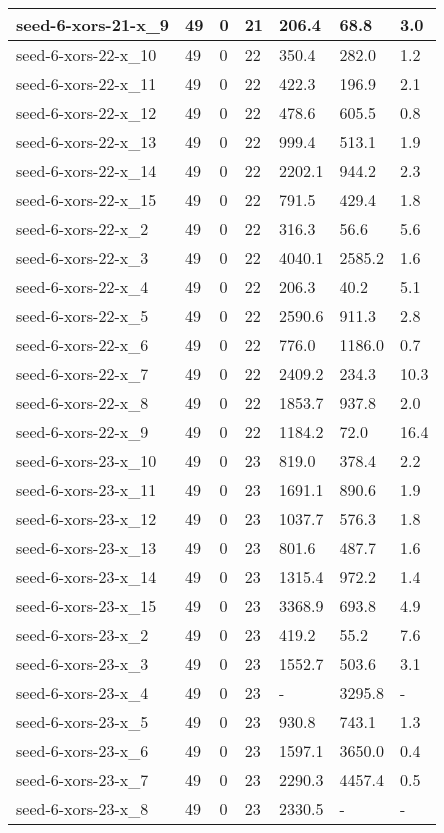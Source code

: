 \begin{scriptsize}
\begin{longtable}{|p{5cm}|l|l|l|l|l|l|}
seed-6-xors-21-x\_9&49&0&21&206.4&68.8&3.0 \\ \hline 
seed-6-xors-22-x\_10&49&0&22&350.4&282.0&1.2 \\ \hline 
seed-6-xors-22-x\_11&49&0&22&422.3&196.9&2.1 \\ \hline 
seed-6-xors-22-x\_12&49&0&22&478.6&605.5&0.8 \\ \hline 
seed-6-xors-22-x\_13&49&0&22&999.4&513.1&1.9 \\ \hline 
seed-6-xors-22-x\_14&49&0&22&2202.1&944.2&2.3 \\ \hline 
seed-6-xors-22-x\_15&49&0&22&791.5&429.4&1.8 \\ \hline 
seed-6-xors-22-x\_2&49&0&22&316.3&56.6&5.6 \\ \hline 
seed-6-xors-22-x\_3&49&0&22&4040.1&2585.2&1.6 \\ \hline 
seed-6-xors-22-x\_4&49&0&22&206.3&40.2&5.1 \\ \hline 
seed-6-xors-22-x\_5&49&0&22&2590.6&911.3&2.8 \\ \hline 
seed-6-xors-22-x\_6&49&0&22&776.0&1186.0&0.7 \\ \hline 
seed-6-xors-22-x\_7&49&0&22&2409.2&234.3&10.3 \\ \hline 
seed-6-xors-22-x\_8&49&0&22&1853.7&937.8&2.0 \\ \hline 
seed-6-xors-22-x\_9&49&0&22&1184.2&72.0&16.4 \\ \hline 
seed-6-xors-23-x\_10&49&0&23&819.0&378.4&2.2 \\ \hline 
seed-6-xors-23-x\_11&49&0&23&1691.1&890.6&1.9 \\ \hline 
seed-6-xors-23-x\_12&49&0&23&1037.7&576.3&1.8 \\ \hline 
seed-6-xors-23-x\_13&49&0&23&801.6&487.7&1.6 \\ \hline 
seed-6-xors-23-x\_14&49&0&23&1315.4&972.2&1.4 \\ \hline 
seed-6-xors-23-x\_15&49&0&23&3368.9&693.8&4.9 \\ \hline 
seed-6-xors-23-x\_2&49&0&23&419.2&55.2&7.6 \\ \hline 
seed-6-xors-23-x\_3&49&0&23&1552.7&503.6&3.1 \\ \hline 
seed-6-xors-23-x\_4&49&0&23&-&3295.8&- \\ \hline 
seed-6-xors-23-x\_5&49&0&23&930.8&743.1&1.3 \\ \hline 
seed-6-xors-23-x\_6&49&0&23&1597.1&3650.0&0.4 \\ \hline 
seed-6-xors-23-x\_7&49&0&23&2290.3&4457.4&0.5 \\ \hline 
seed-6-xors-23-x\_8&49&0&23&2330.5&-&- \\ \hline 

\end{longtable}
\end{scriptsize}
